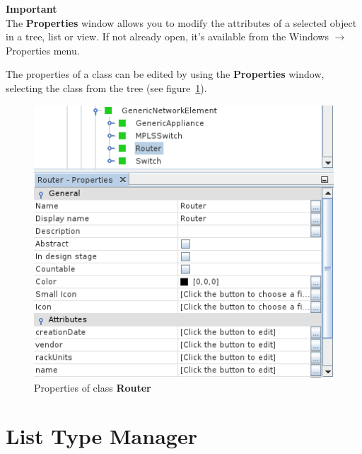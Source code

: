 \documentclass[a4paper]{article}
\begin{document}
		\begin{framed} {\large \textbf{Important}} \\
				The \textbf{Properties} window allows you to modify the attributes of a selected object in a tree, list or view. If not already open, it's available from the Windows $\rightarrow$ Properties menu.
		\end{framed}
		The properties of a class can be edited by using the \textbf{Properties} window, selecting the class from the tree (see figure~\ref{fig:properties_class_node}). 
		\begin{figure}[h!]
			\centering
			\includegraphics[width=0.5\linewidth]{img/properties_class_node.png}
			\caption{Properties of class \textbf{Router}}
			\label{fig:properties_class_node}
		\end{figure}
	\newpage
	\section{List Type Manager} \label{sec:list_type_manager}
\end{document}
